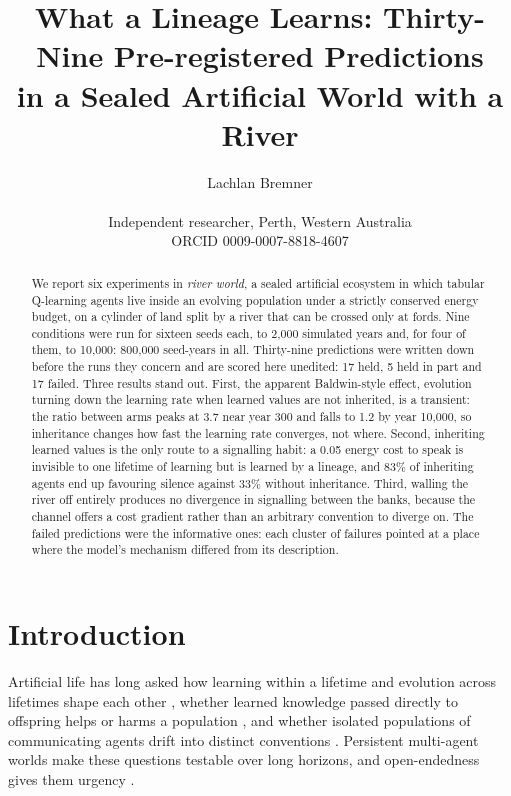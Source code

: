 \documentclass[letterpaper]{article}
\title{What a Lineage Learns: Thirty-Nine Pre-registered Predictions\\in a Sealed Artificial World with a River}
\author{Lachlan Bremner \\
\mbox{}\\
Independent researcher, Perth, Western Australia \\
ORCID 0009-0007-8818-4607}
\begin{document}
\maketitle

\begin{abstract}
We report six experiments in \emph{river world}, a sealed artificial ecosystem in which tabular
Q-learning agents live inside an evolving population under a strictly conserved energy budget, on a
cylinder of land split by a river that can be crossed only at fords. Nine conditions were run for
sixteen seeds each, to 2,000 simulated years and, for four of them, to 10,000: 800,000
seed-years in all. Thirty-nine predictions were written down before the runs they concern and are
scored here unedited: 17 held, 5 held in part and 17 failed. Three results stand out. First, the
apparent Baldwin-style effect, evolution turning down the learning rate when learned values are not
inherited, is a transient: the ratio between arms peaks at 3.7 near year 300 and falls to 1.2 by year
10,000, so inheritance changes how fast the learning rate converges, not where. Second, inheriting
learned values is the only route to a signalling habit: a 0.05 energy cost to speak is invisible to
one lifetime of learning but is learned by a lineage, and 83\% of inheriting agents end up favouring
silence against 33\% without inheritance. Third, walling the river off entirely produces no divergence
in signalling between the banks, because the channel offers a cost gradient rather than an arbitrary
convention to diverge on. The failed predictions were the informative ones: each cluster of failures
pointed at a place where the model's mechanism differed from its description.
\end{abstract}

\section{Introduction}

Artificial life has long asked how learning within a lifetime and evolution across lifetimes shape
each other \citep{baldwin1896,hinton1987,ackley1991}, whether learned knowledge passed directly to
offspring helps or harms a population \citep{ackley1994}, and whether isolated populations of
communicating agents drift into distinct conventions \citep{steels1995,kirby2002}. Persistent
multi-agent worlds \citep{ray1991,yaeger1994,suarez2019} make these questions testable over long
horizons, and open-endedness gives them urgency \citep{bedau2000,packard2019,hughes2024}.
\end{document}
